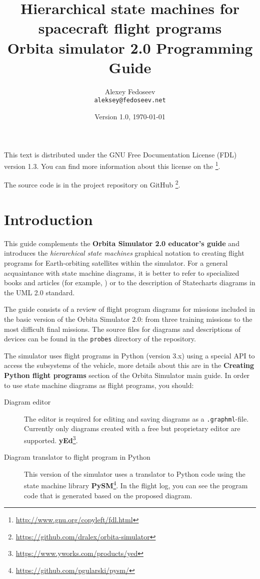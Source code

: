 \documentclass[12pt,a4paper]{article}
\begin{document}
\title{%
  \textbf{Hierarchical state machines for
spacecraft flight programs} \\
    Orbita simulator 2.0 Programming Guide}

\author{
  Alexey Fedoseev\\
  \texttt{aleksey@fedoseev.net}
}

\date{Version 1.0, \today}

\maketitle

This text is distributed under the GNU Free Documentation License (FDL) version
1.3. You can find more information about this license on the
\footnote{\url{http://www.gnu.org/copyleft/fdl.html}}.

The source code is in the project repository on GitHub
\footnote{\url{https://github.com/dralex/orbita-simulator}}.

\tableofcontents

\clearpage
\section{Introduction}

This guide complements the \textbf{Orbita Simulator 2.0 educator's guide} and introduces the \emph{hierarchical state machines} graphical notation to creating flight programs for Earth-orbiting satellites within the simulator. For a general acquaintance with state machine diagrams, it is better to refer to specialized books and articles (for example, \cite{CRASHCOURSE}) or to the description of Statecharts diagrams in the UML 2.0 standard.

The guide consists of a review of flight program diagrams for missions included in the basic version of the Orbita Simulator 2.0: from three training missions to the most difficult final missions. The source files for diagrams and descriptions of devices can be found in the \verb'probes' directory of the repository.

The simulator uses flight programs in Python (version 3.x) using a special API to access the subsystems of the vehicle, more details about this are in the \textbf{Creating Python flight programs} section of the Orbita Simulator main guide. In order to use state machine diagrams as flight programs, you should:

\begin{description}
\item[Diagram editor] The editor is required for editing and saving diagrams as a \verb'.graphml'-file. Currently only diagrams created with a free but proprietary editor are supported.
  \textbf{yEd}\footnote{\url{https://www.yworks.com/products/yed}}.
\item[Diagram translator to flight program in Python] This version of the simulator uses a translator to Python code using the state machine library
  \textbf{PySM}\footnote{\url{https://github.com/pgularski/pysm/}}. In the flight log, you can see the program code that is generated based on the proposed diagram.
\end{description}
\end{document}
